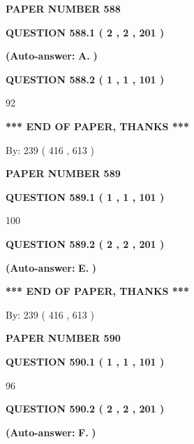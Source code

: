 \documentclass{ctexart}
\begin{document}
   
 {\textbf{ \Large{ PAPER NUMBER  588  }}}
   
   
   
   
  
  
{\textbf{\large{QUESTION
588.1 
 ( 2 , 2 , 201 )
}}}
 
 
{\textbf{(Auto-answer:}}
{\textbf{\large{
A.}}}
{\textbf{)}}
 
 
  
  
{\textbf{\large{QUESTION
588.2 
 ( 1 , 1 , 101 )
}}}

92
   
   
   
   
\vspace{1.0in} 
{\textbf{\large{ *** END OF PAPER, THANKS *** }}} 
   
   
\hspace{1.0in} By: 
 239 ( 416 ,  613 )
   
   
   
   
\newpage 
\setcounter{page}{ 
   589001 } 
   
   
 {\textbf{ \Large{ PAPER NUMBER  589  }}}
   
   
   
   
  
  
{\textbf{\large{QUESTION
589.1 
 ( 1 , 1 , 101 )
}}}

100
  
  
{\textbf{\large{QUESTION
589.2 
 ( 2 , 2 , 201 )
}}}
 
 
{\textbf{(Auto-answer:}}
{\textbf{\large{
E.}}}
{\textbf{)}}
 
 
   
   
   
   
\vspace{1.0in} 
{\textbf{\large{ *** END OF PAPER, THANKS *** }}} 
   
   
\hspace{1.0in} By: 
 239 ( 416 ,  613 )
   
   
   
   
\newpage 
\setcounter{page}{ 
   590001 } 
   
   
 {\textbf{ \Large{ PAPER NUMBER  590  }}}
   
   
   
   
  
  
{\textbf{\large{QUESTION
590.1 
 ( 1 , 1 , 101 )
}}}

96
  
  
{\textbf{\large{QUESTION
590.2 
 ( 2 , 2 , 201 )
}}}
 
 
{\textbf{(Auto-answer:}}
{\textbf{\large{
F.}}}
{\textbf{)}}
 
\end{document}
